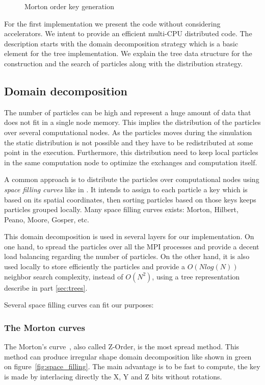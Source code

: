 \begin{figure}[t!]
\centering

\caption{Morton order key generation}
\end{figure}

For the first implementation we present the code without considering accelerators. 
We intent to provide an efficient multi-CPU distributed code. 
The description starts with the domain decomposition strategy which is a basic element for the tree implementation.
We explain the tree data structure for the construction and the search of particles along with the distribution strategy.

\subsection{Domain decomposition}
\label{sec:domain_decomposition}
The number of particles can be high and represent a huge amount of data that does not fit in a single node memory. 
This implies the distribution of the particles over several computational nodes. 
As the particles moves during the simulation the static distribution is not possible and they have to be redistributed at some point in the execution. 
Furthermore, this distribution need to keep local particles in the same computation node to optimize the exchanges and computation itself.

A common approach is to distribute the particles over computational nodes using \textit{space filling curves} like in \cite{warren20132hot,springel2005cosmological,bedorf201424}. 
It intends to assign to each particle a key which is based on its spatial coordinates, then sorting particles based on those keys keeps particles grouped locally.
Many space filling curves exists: Morton, Hilbert, Peano, Moore, Gosper, etc.\

This domain decomposition is used in several layers for our implementation. 
On one hand, to spread the particles over all the MPI processes and provide a decent load balancing regarding the number of particles. 
On the other hand, it is also used locally to store efficiently the particles and provide a $O(N log(N))$ neighbor search complexity, instead of $O(N^2)$, using a tree representation describe in part \ref{sec:trees}. 

Several space filling curves can fit our purposes:
\subsubsection*{The Morton curves} The Morton's curve~\cite{morton1966computer}, also called Z-Order, is the most spread method. 
This method can produce irregular shape domain decomposition like shown in green on figure~\ref{fig:space_filling}. 
The main advantage is to be fast to compute, the key is made by interlacing directly the X, Y and Z bits without rotations. 
